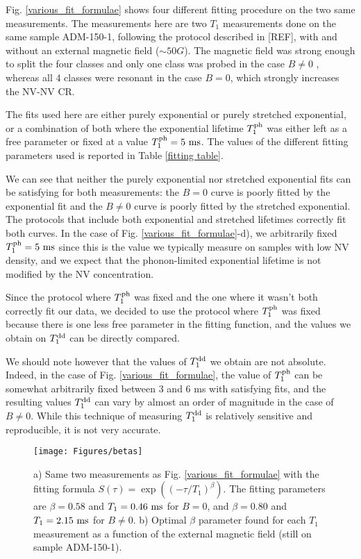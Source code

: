 \documentclass[a4paper,11pt]{report}
\begin{document}
Fig. \ref{various_fit_formulae} shows four different fitting procedure on the two same measurements. The measurements here are two $T_1$ measurements done on the same sample ADM-150-1, following the protocol described in [REF], with and without an external magnetic field ($\sim 50 G$). The magnetic field was strong enough to split the four classes and only one class was probed in the case $B\neq0$ , whereas all 4 classes were resonant in the case $B=0$, which strongly increases the NV-NV CR. 

The fits used here are either purely exponential or purely stretched exponential, or a combination of both where the exponential lifetime $T_1^{\rm ph}$ was either left as a free parameter or fixed at a value $T_1^{\rm ph}=5\ \rm ms$. The values of the different fitting parameters used is reported in Table \ref{fitting table}.

We can see that neither the purely exponential nor stretched exponential fits can be satisfying for both measurements: the $B=0$ curve is poorly fitted by the exponential fit and the $B \neq 0$ curve is poorly fitted by the stretched exponential. The protocols that include both exponential and stretched lifetimes correctly fit both curves. In the case of Fig. \ref{various_fit_formulae}-d), we arbitrarily fixed $T_1^{\rm ph}=5\ \rm ms$ since this is the value we typically measure on samples with low NV density, and we expect that the phonon-limited exponential lifetime is not modified by the NV concentration.

Since the protocol where $T_1^{\rm ph}$ was fixed and the one where it wasn't both correctly fit our data, we decided to use the protocol where $T_1^{\rm ph}$ was fixed because there is one less free parameter in the fitting function, and the values we obtain on $T_1^{\rm dd}$ can be directly compared. 

We should note however that the values of $T_1^{\rm dd}$ we obtain are not absolute. Indeed, in the case of Fig. \ref{various_fit_formulae}, the value of $T_1^{\rm ph}$ can be somewhat arbitrarily fixed between 3 and 6 ms with satisfying fits, and the resulting values $T_1^{\rm dd}$ can vary by almost an order of magnitude in the case of $B\neq0$. While this technique of measuring $T_1^{\rm dd}$ is relatively sensitive and reproducible, it is not very accurate.

\begin{figure}[h]
\centering
\texttt{[image: Figures/betas]}
\caption{a) Same two measurements as Fig. \ref{various_fit_formulae} with the fitting formula $S(\tau)=\exp ((-\tau/T_1)^{\beta})$. The fitting parameters are $\beta=0.58$ and $T_1=0.46\ \rm ms$ for $B=0$, and $\beta=0.80$ and $T_1=2.15\ \rm ms$ for $B\neq0$. b) Optimal $\beta$ parameter found for each $T_1$ measurement as a function of the external magnetic field (still on sample ADM-150-1).}
\label{betas}
\end{figure}
\end{document}
